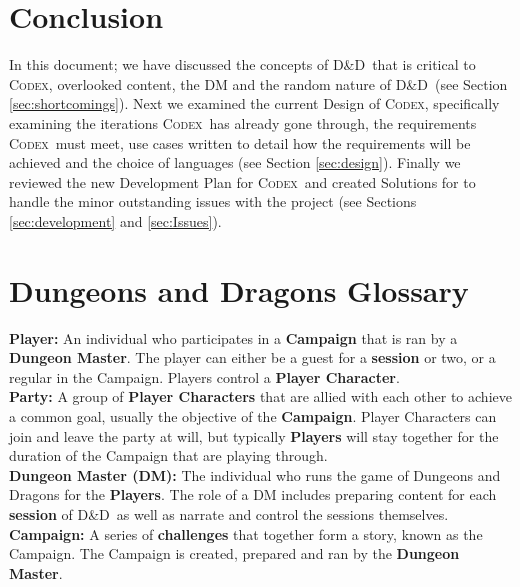 \documentclass[progress]{cmpreport}
\newcommand{\dnd}{D\&D}
\newcommand{\Codex}{\textsc{Codex}}
\begin{document}
	\section{Conclusion} \label{sec:conclusions}
	In this document; we have discussed the concepts of \dnd \ that is critical to \Codex, overlooked content, the DM and the random nature of \dnd \ (see Section \ref{sec:shortcomings}). Next we examined the current Design of \Codex, specifically examining the iterations \Codex \ has already gone through, the requirements \Codex \ must meet, use cases written to detail how the requirements will be achieved and the choice of languages (see Section \ref{sec:design}). Finally we reviewed the new Development Plan for \Codex \ and created Solutions for to handle the minor outstanding issues with the project (see Sections \ref{sec:development} and \ref{sec:Issues}).

	\clearpage
	
	\appendix
	\section{Dungeons and Dragons Glossary} \label{app:example}
	\textbf{Player:} An individual who participates in a \textbf{Campaign} that is ran by a \textbf{Dungeon Master}. The player can either be a guest for a \textbf{session} or two, or a regular in the Campaign. Players control a \textbf{Player Character}. \\
	
	\textbf{Party:} A group of \textbf{Player Characters} that are allied with each other to achieve a common goal, usually the objective of the \textbf{Campaign}. Player Characters can join and leave the party at will, but typically \textbf{Players} will stay together for the duration of the Campaign that are playing through. \\ 
	
	\textbf{Dungeon Master (DM):} The individual who runs the game of Dungeons and Dragons for the \textbf{Players}. The role of a DM includes preparing content for each \textbf{session} of \dnd \ as well as narrate and control the sessions themselves.\\
	
	\textbf{Campaign:} A series of \textbf{challenges} that together form a story, known as the Campaign. The Campaign is created, prepared and ran by the \textbf{Dungeon Master}.\\
	
\end{document}
